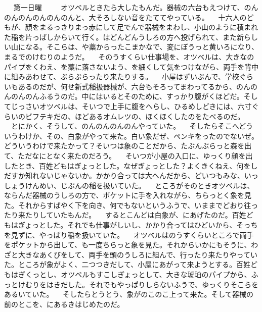 　
第一日曜
　
　オツベルときたら大したもんだ。器械の六台もえつけて、のんのんのんのんのんのんと、大そろしない音をたててやっている。
　十六人のどもが、顔をまるっきりまっ赤にして足でんで器械をまわし、小山のように積まれた稲を片っぱしからいて行く。はどんどんうしろの方へ投げられて、また新らしい山になる。そこらは、や藁からったこまかなで、変にぼうっと黄いろになり、まるでのけむりのようだ。
　そのうすくらい仕事場を、オツベルは、大きなのパイプをくわえ、を藁に落さないよう、を細くして気をつけながら、両手を背中に組みあわせて、ぶらぶらったり来たりする。
　小屋はずいぶんで、学校ぐらいもあるのだが、何せ新式稲扱器械が、六台もそろってまわってるから、のんのんのんのんふるうのだ。中にはいるとそのために、すっかり腹がくほどだ。そしてじっさいオツベルは、そいつで上手に腹をへらし、ひるめしどきには、六寸ぐらいのビフテキだの、ほどあるオムレツの、ほくほくしたのをたべるのだ。
　とにかく、そうして、のんのんのんのんやっていた。
　そしたらそこへどういうわけか、その、白象がやって来た。白い象だぜ、ペンキをったのでないぜ。どういうわけで来たかって？{}そいつは象のことだから、たぶんぶらっと森を出て、ただなにとなく来たのだろう。
　そいつが小屋の入口に、ゆっくり顔を出したとき、百姓どもはぎょっとした。なぜぎょっとした？{}よくきくねえ、何をしだすか知れないじゃないか。かかり合っては大へんだから、どいつもみな、いっしょうけんめい、じぶんの稲を扱いていた。
　ところがそのときオツベルは、ならんだ器械のうしろの方で、ポケットに手を入れながら、ちらっとく象を見た。それからすばやく下を向き、何でもないというふうで、いままでどおり往ったり来たりしていたもんだ。
　するとこんどは白象が、にあげたのだ。百姓どもはぎょっとした。それでも仕事がしいし、かかり合ってはひどいから、そっちを見ずに、やっぱり稲を扱いていた。
　オツベルはのうすくらいところで両手をポケットから出して、も一度ちらっと象を見た。それからいかにもそうに、わざと大きなあくびをして、両手を頭のうしろに組んで、行ったり来たりやっていた。ところが象がよく、二つつきだして、小屋にあがって来ようとする。百姓どもはぎくっとし、オツベルもすこしぎょっとして、大きな琥珀のパイプから、ふっとけむりをはきだした。それでもやっぱりしらないふうで、ゆっくりそこらをあるいていた。
　そしたらとうとう、象がのこのこ上って来た。そして器械の前のとこを、にあるきはじめたのだ。
